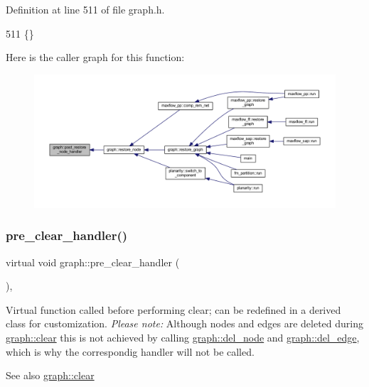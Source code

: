 Definition at line 511 of file graph.\+h.


\begin{DoxyCode}
511 \{\}
\end{DoxyCode}
Here is the caller graph for this function\+:
\nopagebreak
\begin{figure}[H]
\begin{center}
\leavevmode
\includegraphics[width=350pt]{classgraph_a2d555506de6aa30bb981f0b60375762d_icgraph}
\end{center}
\end{figure}
\mbox{\label{classgraph_a16ccad78837d16be59854549cd2d847a}} 
\subsubsection{\texorpdfstring{pre\+\_\+clear\+\_\+handler()}{pre\_clear\_handler()}}
{\footnotesize\ttfamily virtual void graph\+::pre\+\_\+clear\+\_\+handler (\begin{DoxyParamCaption}{ }\end{DoxyParamCaption})\hspace{0.3cm}{\ttfamily [inline]}, {\ttfamily [virtual]}}

Virtual function called before performing clear; can be redefined in a derived class for customization. {\itshape Please note\+:} Although nodes and edges are deleted during \mbox{\hyperlink{classgraph_a9ff5d6af3653e79f87b836701453f55a}{graph\+::clear}} this is not achieved by calling \mbox{\hyperlink{classgraph_a8bdc09d5b9ac4bd26586b054d8fcbe91}{graph\+::del\+\_\+node}} and \mbox{\hyperlink{classgraph_ad9356508c49c542dfd4b7169297387c6}{graph\+::del\+\_\+edge}}, which is why the correspondig handler will not be called.

\begin{DoxySeeAlso}{See also}
\mbox{\hyperlink{classgraph_a9ff5d6af3653e79f87b836701453f55a}{graph\+::clear}} 
\end{DoxySeeAlso}


